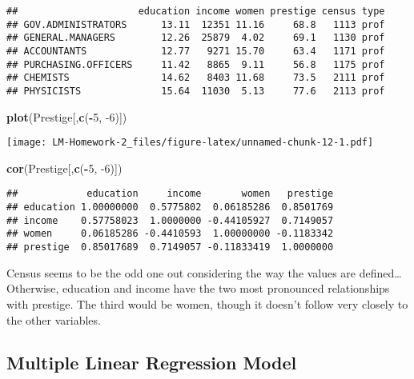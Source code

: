 \documentclass[
]{article}
\newenvironment{Shaded}{\begin{snugshade}}{\end{snugshade}}
\newcommand{\DecValTok}[1]{\textcolor[rgb]{0.00,0.00,0.81}{#1}}
\newcommand{\KeywordTok}[1]{\textcolor[rgb]{0.13,0.29,0.53}{\textbf{#1}}}
\newcommand{\NormalTok}[1]{#1}
\newcommand{\OperatorTok}[1]{\textcolor[rgb]{0.81,0.36,0.00}{\textbf{#1}}}
\begin{document}
\begin{verbatim}
##                     education income women prestige census type
## GOV.ADMINISTRATORS      13.11  12351 11.16     68.8   1113 prof
## GENERAL.MANAGERS        12.26  25879  4.02     69.1   1130 prof
## ACCOUNTANTS             12.77   9271 15.70     63.4   1171 prof
## PURCHASING.OFFICERS     11.42   8865  9.11     56.8   1175 prof
## CHEMISTS                14.62   8403 11.68     73.5   2111 prof
## PHYSICISTS              15.64  11030  5.13     77.6   2113 prof
\end{verbatim}

\begin{Shaded}
\begin{Highlighting}[]
\KeywordTok{plot}\NormalTok{(Prestige[,}\KeywordTok{c}\NormalTok{(}\OperatorTok{-}\DecValTok{5}\NormalTok{, }\DecValTok{-6}\NormalTok{)])}
\end{Highlighting}
\end{Shaded}

\texttt{[image: LM-Homework-2\_files/figure-latex/unnamed-chunk-12-1.pdf]}

\begin{Shaded}
\begin{Highlighting}[]
\KeywordTok{cor}\NormalTok{(Prestige[,}\KeywordTok{c}\NormalTok{(}\OperatorTok{-}\DecValTok{5}\NormalTok{, }\DecValTok{-6}\NormalTok{)])}
\end{Highlighting}
\end{Shaded}

\begin{verbatim}
##            education     income       women   prestige
## education 1.00000000  0.5775802  0.06185286  0.8501769
## income    0.57758023  1.0000000 -0.44105927  0.7149057
## women     0.06185286 -0.4410593  1.00000000 -0.1183342
## prestige  0.85017689  0.7149057 -0.11833419  1.0000000
\end{verbatim}

Census seems to be the odd one out considering the way the values are
defined\ldots{} Otherwise, education and income have the two most
pronounced relationships with prestige. The third would be women, though
it doesn't follow very closely to the other variables.

\hypertarget{multiple-linear-regression-model}{%
\subsection{Multiple Linear Regression
Model}\label{multiple-linear-regression-model}}
\end{document}
